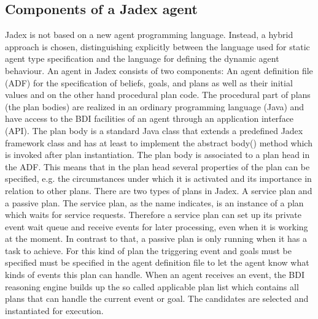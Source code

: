 \subsection{Components of a Jadex agent}
Jadex is not based on a new agent programming language. Instead, a hybrid approach is chosen, distinguishing explicitly between the language used for static agent type specification and the language for defining the dynamic agent behaviour. An agent in Jadex consists of two components: An agent definition file (ADF) for the specification of beliefs, goals, and plans as well as their initial values and on the other hand procedural plan code. The procedural part of plans  (the plan bodies) are realized in an ordinary programming language (Java) and have access to the BDI facilities of an agent through an application interface (API). The plan body is a standard Java class that extends a predefined Jadex framework class and has at least to implement the abstract body() method which is invoked after plan instantiation. The plan body is associated to a plan head in the ADF. This means that in the plan head several properties of the plan can be specified, e.g. the circumstances under which it is activated and its importance in relation to other plans. There are two types of plans in Jadex. A service plan and a passive plan. The service plan, as the name indicates, is an instance of a plan which waits for service requests. Therefore a service plan  can set up its private event wait queue and receive events for later processing, even when it is working at the moment. In contrast to that, a passive plan is only running when it has a task to achieve. For this kind of plan the triggering event and goals must be specified must be specified in the agent definition file to let the agent know what kinds of events this plan can handle. When an agent receives an event, the BDI reasoning engine builds up the so called applicable plan list which contains all plans that can handle the current event or goal. The candidates are selected and instantiated for execution.

